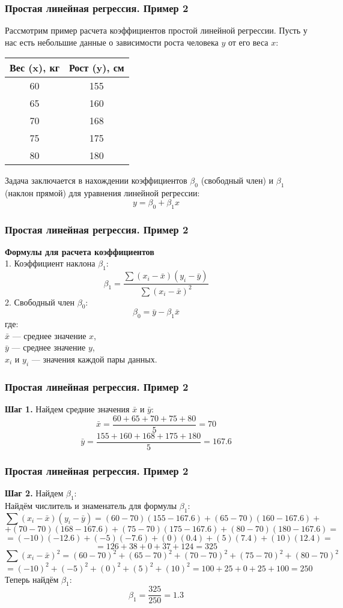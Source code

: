 \documentclass[aspectratio=169]{beamer}
\begin{document}
\begin{frame}
\frametitle{Простая линейная регрессия. Пример 2}
Рассмотрим пример расчета коэффициентов простой линейной регрессии. Пусть у нас есть небольшие данные о зависимости роста человека \( y \) от его веса \( x \):
\begin{center}
\begin{tabular}{ |c|c| } 
 \hline
 Вес (x), кг & Рост (y), см \\ 
 \hline
 60 & 155\\
 \hline
 65 & 160\\
 \hline
 70 & 168\\
 \hline
 75 & 175\\
 \hline
 80 & 180\\
 \hline
\end{tabular}
\end{center}
Задача заключается в нахождении коэффициентов \( \beta_0 \) (свободный член) и \( \beta_1 \) (наклон прямой) для уравнения линейной регрессии:
\[
y = \beta_0 + \beta_1 x
\]
\end{frame}

\begin{frame}
\frametitle{Простая линейная регрессия. Пример 2}
{\bf Формулы для расчета коэффициентов}\\
1. Коэффициент наклона \( \beta_1 \):
\[
\beta_1 = \frac{\sum (x_i - \bar{x})(y_i - \bar{y})}{\sum (x_i - \bar{x})^2}
\]
2. Свободный член \( \beta_0 \):
\[
\beta_0 = \bar{y} - \beta_1 \bar{x}
\]
где:\\
\quad \( \bar{x} \) — среднее значение \( x \),\\
\quad \( \bar{y} \) — среднее значение \( y \),\\
\quad \( x_i \) и \( y_i \) — значения каждой пары данных.
\end{frame}

\begin{frame}
\frametitle{Простая линейная регрессия. Пример 2}
{\bf Шаг 1.} Найдем средние значения \( \bar{x} \) и \( \bar{y} \):
\[
\bar{x} = \frac{60 + 65 + 70 + 75 + 80}{5} = 70
\]
\[
\bar{y} = \frac{155 + 160 + 168 + 175 + 180}{5} = 167.6
\]
\end{frame}

\begin{frame}
\frametitle{Простая линейная регрессия. Пример 2}
{\bf Шаг 2.} Найдем \( \beta_1 \):\\
Найдём числитель и знаменатель для формулы \( \beta_1 \):
\[
\sum (x_i - \bar{x})(y_i - \bar{y}) = (60 - 70)(155 - 167.6) + (65 - 70)(160 - 167.6) +
\]
\[
+ (70 - 70)(168 - 167.6) + (75 - 70)(175 - 167.6) + (80 - 70)(180 - 167.6) =
\]
\[
= (-10)(-12.6) + (-5)(-7.6) + (0)(0.4) + (5)(7.4) + (10)(12.4) =
\]
\[
= 126 + 38 + 0 + 37 + 124 = 325
\]
\[
\sum (x_i - \bar{x})^2 = (60 - 70)^2 + (65 - 70)^2 + (70 - 70)^2 + (75 - 70)^2 + (80 - 70)^2
\]
\[
= (-10)^2 + (-5)^2 + (0)^2 + (5)^2 + (10)^2 = 100 + 25 + 0 + 25 + 100 = 250
\]
Теперь найдём \( \beta_1 \):
\[
\beta_1 = \frac{325}{250} = 1.3
\]
\end{frame}
\end{document}
